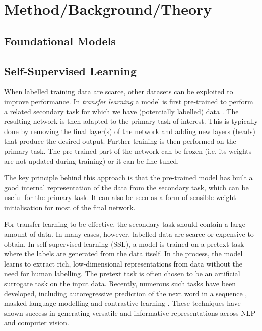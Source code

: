 \documentclass[a4paper,12pt]{article}
\begin{document}
\section{Method/Background/Theory}
\subsection{Foundational Models}
\subsection{Self-Supervised Learning}
When labelled training data are scarce, other datasets can be exploited to improve performance. In \emph{transfer learning} a model is first pre-trained to perform a related secondary task for which we have (potentially labelled) data \cite{udl}. The resulting network is then adapted to the primary task of interest. This is typically done by removing the final layer(s) of the network and adding new layers (heads) that produce the desired output. Further training is then performed on the primary task. The pre-trained part of the network can be frozen (i.e. its weights are not updated during training) or it can be fine-tuned. 

The key principle behind this approach is that the pre-trained model has built a good internal representation of the data from the secondary task, which can be useful for the primary task. It can also be seen as a form of sensible weight initialisation for most of the final network.

For transfer learning to be effective, the secondary task should contain a large amount of data. In many cases, however, labelled data are scarce or expensive to obtain. In self-supervised learning (SSL), a model is trained on a pretext task where the labels are generated from the data itself. In the process, the model learns to extract rich, low-dimensional representations from data without the need for human labelling. The pretext task is often chosen to be an artificial surrogate task on the input data. Recently, numerous such tasks have been developed, including autoregressive prediction of the next word in a sequence \cite{radford2019language}, masked language modelling \cite{devlin2018bert} and contrastive learning \cite{radford2021learning}. These techniques have shown success in generating versatile and informative representations across NLP and computer vision.
\end{document}
